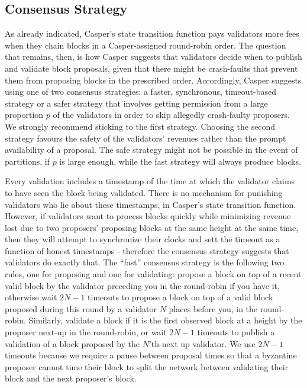 \documentclass[11pt,a4paper]{article}
\begin{document}
\subsection{Consensus Strategy}

As already indicated, Casper's state transition function pays validators more fees when they chain blocks in a Casper-assigned round-robin order. The question that remains, then, is how Casper suggests that validators decide when to publish and validate block proposals, given that there might be crash-faults that prevent them from proposing blocks in the prescribed order. Accordingly, Casper suggests using one of two consensus strategies: a faster, synchronous, timeout-based strategy or a safer strategy that involves getting permission from a large proportion $p$ of the validators in order to skip allegedly crash-faulty proposers. We strongly recommend sticking to the first strategy. Choosing the second strategy favours the safety of the validators' revenues rather than the prompt availability of a proposal. The safe strategy might not be possible in the event of partitions, if $p$ is large enough, while the fast strategy will always produce blocks.

Every validation includes a timestamp of the time at which the validator claims to have seen the block being validated. There is no mechanism for punishing validators who lie about these timestamps, in Casper's state transition function. However, if validators want to process blocks quickly while minimizing revenue lost due to two proposers' proposing blocks at the same height at the same time, then they will attempt to synchronize their clocks and sett the timeout as a function of honest timestamps - therefore the consensus strategy suggests that validators do exactly that. The ``fast'' consensus strategy is the following two rules, one for proposing and one for validating: propose a block on top of a recent valid block by the validator preceding you in the round-robin if you have it, otherwise wait $2N - 1$ timeouts to propose a block on top of a valid block proposed during this round by a validator $N$ places before you, in the round-robin. Similarly, validate a block if it is the first observed block at a height by the proposer next-up in the round-robin, or wait $2N - 1$ timeouts to publish a validation of a block proposed by the $N$'th-next up validator. We use $2N - 1$ timeouts because we require a pause between proposal times so that a byzantine proposer cannot time their block to split the network between validating their block and the next proposer's block.
\end{document}
